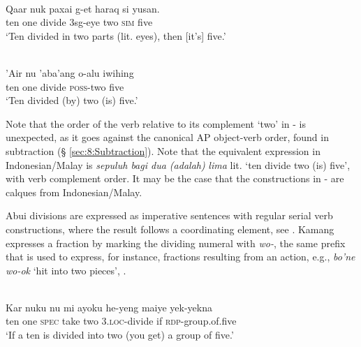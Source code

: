  

 


\ea
\label{ex:8:1246}
\\  
 \gll Qaar  nuk  paxai  g-et  haraq  si  yusan.   \\
  ten  one  divide  3sg-eye  two  \textsc{sim}  five   \\
 \glt `Ten divided in two parts (lit. eyes), then [it's] five.'
\z
 

\ea%
\label{bkm:Ref342664505}
\\
\gll  'Air nu  'aba'ang  o-alu  iwihing\\  
    ten one  divide  \textsc{poss-}two  five \\
\glt `Ten divided (by) two (is) five.'  
\z

 

 

  

Note that the order of the verb relative to its complement `two' in - is unexpected, as it goes against the canonical AP object-verb order, found in subtraction ({\S} \ref{sec:8:Subtraction}). Note that the equivalent expression in Indonesian/Malay is \textit{sepuluh bagi dua (adalah)} \textit{lima} lit. `ten divide two (is) five', with verb complement order. It may be the case that the constructions in - are calques from Indonesian/Malay. 

Abui divisions are expressed as imperative sentences with regular serial verb constructions, where the result follows a coordinating element, see . Kamang expresses a fraction by marking the dividing numeral with \textit{wo-}, the same prefix that is used to express, for instance, fractions resulting from an action, e.g., \textit{bo'ne wo-ok} `hit into two pieces', . 


\ea%
\label{bkm:Ref358116296}
\\
\gll  Kar  nuku  nu  mi  ayoku  he-yeng  maiye  yek-yekna \\  
    ten  one  \textsc{spec}  take  two  3.\textsc{loc-}divide  if  \textsc{rdp-}group.of.five \\
\glt  `If a ten is divided into two (you get) a group of five.'
\z



 




